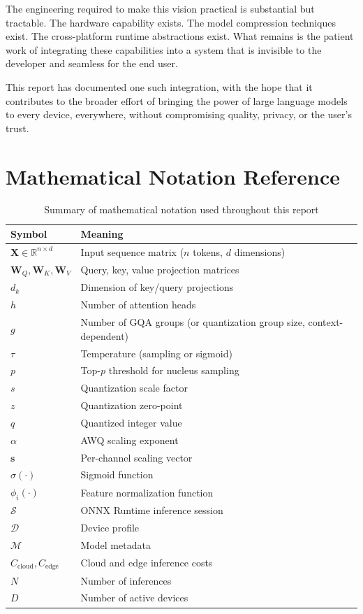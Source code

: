 \documentclass[12pt, letterpaper, twoside]{report}
\begin{document}
The engineering required to make this vision practical is substantial but tractable. The hardware capability exists. The model compression techniques exist. The cross-platform runtime abstractions exist. What remains is the patient work of integrating these capabilities into a system that is invisible to the developer and seamless for the end user.

This report has documented one such integration, with the hope that it contributes to the broader effort of bringing the power of large language models to every device, everywhere, without compromising quality, privacy, or the user's trust.

\appendix

\chapter{Mathematical Notation Reference}
\label{app:notation}

\begin{table}[H]
\centering
\caption{Summary of mathematical notation used throughout this report}
\begin{tabularx}{\textwidth}{@{}lX@{}}
\toprule
\textbf{Symbol} & \textbf{Meaning} \\
\midrule
$\mathbf{X} \in \mathbb{R}^{n \times d}$ & Input sequence matrix ($n$ tokens, $d$ dimensions) \\
$\mathbf{W}_Q, \mathbf{W}_K, \mathbf{W}_V$ & Query, key, value projection matrices \\
$d_k$ & Dimension of key/query projections \\
$h$ & Number of attention heads \\
$g$ & Number of GQA groups (or quantization group size, context-dependent) \\
$\tau$ & Temperature (sampling or sigmoid) \\
$p$ & Top-$p$ threshold for nucleus sampling \\
$s$ & Quantization scale factor \\
$z$ & Quantization zero-point \\
$q$ & Quantized integer value \\
$\alpha$ & AWQ scaling exponent \\
$\mathbf{s}$ & Per-channel scaling vector \\
$\sigma(\cdot)$ & Sigmoid function \\
$\phi_i(\cdot)$ & Feature normalization function \\
$\mathcal{S}$ & ONNX Runtime inference session \\
$\mathcal{D}$ & Device profile \\
$\mathcal{M}$ & Model metadata \\
$C_{\text{cloud}}, C_{\text{edge}}$ & Cloud and edge inference costs \\
$N$ & Number of inferences \\
$D$ & Number of active devices \\
\bottomrule
\end{tabularx}
\end{table}
\end{document}
